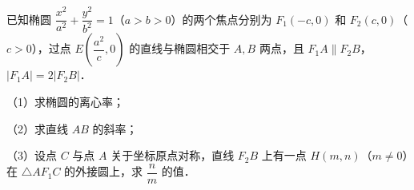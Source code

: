 \begin{question}
已知椭圆 $\dfrac{x^2}{a^2}+\dfrac{y^2}{b^2}=1$（$a>b>0$）的两个焦点分别为 $F_1(-c,0)$ 和 $F_2(c,0)$（$c>0$），过点 $E\left(\dfrac{a^2}{c},0\right)$ 的直线与椭圆相交于 $A,B$ 两点，且 $F_1A\parallel F_2B$，$|F_1A|=2|F_2B|$．

（1）求椭圆的离心率；

（2）求直线 $AB$ 的斜率；

（3）设点 $C$ 与点 $A$ 关于坐标原点对称，直线 $F_2B$ 上有一点 $H(m,n)$（$m\neq0$）在 $\triangle AF_1C$ 的外接圆上，求 $\dfrac nm$ 的值．

\end{question}